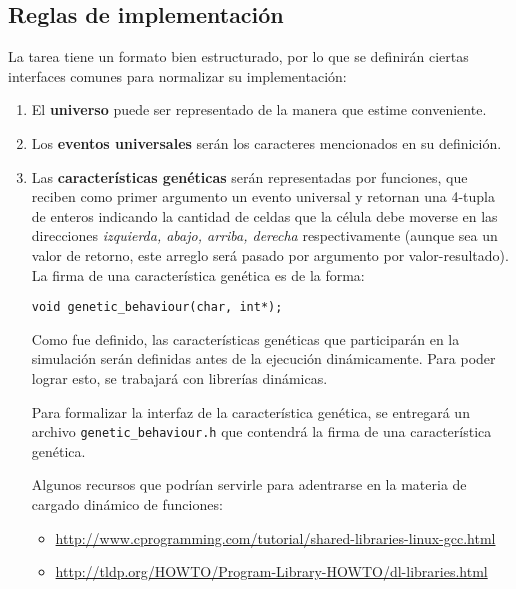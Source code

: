 \documentclass[letterpaper,10pt]{article}
\begin{document}
\subsection{Reglas de implementación}

La tarea tiene un formato bien estructurado, por lo que se definirán ciertas interfaces comunes para normalizar su implementación:

\begin{enumerate}
	\item El \textbf{universo} puede ser representado de la manera que estime conveniente.
	\item Los \textbf{eventos universales} serán los caracteres mencionados en su definición.
	\item Las \textbf{características genéticas} serán representadas por funciones, que reciben como primer argumento un evento universal y retornan una 4-tupla de enteros indicando la cantidad de celdas que la célula debe moverse en las direcciones \emph{izquierda, abajo, arriba, derecha} respectivamente (aunque sea un valor de retorno, este arreglo será pasado por argumento por valor-resultado). La firma de una característica genética es de la forma:

\begin{lstlisting}
void genetic_behaviour(char, int*);
\end{lstlisting}

		Como fue definido, las características genéticas que participarán en la simulación serán definidas antes de la ejecución dinámicamente. Para poder lograr esto, se trabajará con librerías dinámicas.
		
		\medskip
		Para formalizar la interfaz de la característica genética, se entregará un archivo \texttt{genetic\_behaviour.h} que contendrá la firma de una característica genética.

		\medskip
		Algunos recursos que podrían servirle para adentrarse en la materia de cargado dinámico de funciones:

\begin{itemize}
    \item \href{http://www.cprogramming.com/tutorial/shared-libraries-linux-gcc.html}{http://www.cprogramming.com/tutorial/shared-libraries-linux-gcc.html}
    \item \href{http://tldp.org/HOWTO/Program-Library-HOWTO/dl-libraries.html}{http://tldp.org/HOWTO/Program-Library-HOWTO/dl-libraries.html}
\end{itemize}


\end{enumerate}
\end{document}
